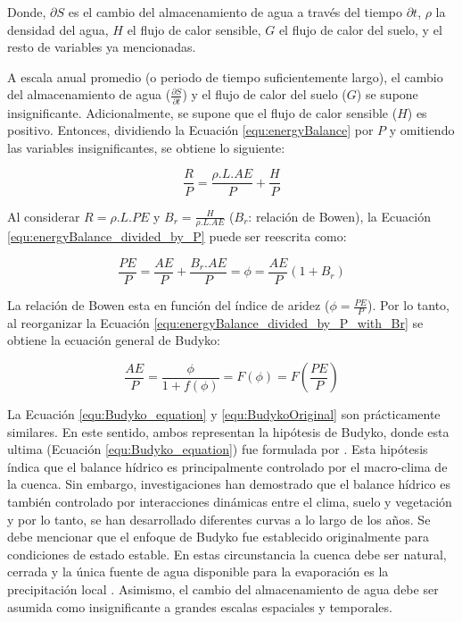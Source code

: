 \documentclass[12pt]{article}
\begin{document}
Donde, $\partial S$ es el cambio del almacenamiento de agua a través del tiempo $\partial t$, $\rho$ la densidad del agua, $H$ el flujo de calor sensible, $G$ el flujo de calor del suelo, y el resto de variables ya mencionadas. 

A escala anual promedio (o periodo de tiempo suficientemente largo), el cambio del almacenamiento de agua ($\frac{\partial S}{\partial t}$) y el flujo de calor del suelo ($G$) se supone insignificante. Adicionalmente, se supone que el flujo de calor sensible ($H$) es positivo. Entonces, dividiendo la Ecuación \ref{equ:energyBalance} por $P$ y omitiendo las variables insignificantes, se obtiene lo siguiente:

\begin{equation}
\frac{R}{P}  = \frac{\rho .L.AE}{P} + \frac{H}{P} \label{equ:energyBalance_divided_by_P}
\end{equation}

Al considerar $R  = \rho .L.PE$ y $B_{r} = \frac{H}{\rho .L.AE}$ ($B_{r}$: relación de Bowen), la Ecuación \ref{equ:energyBalance_divided_by_P} puede ser reescrita como:

\begin{equation}
\frac{PE}{P} = \frac{AE}{P} + \frac{B_{r}.AE}{P} = \phi = \frac{AE}{P}(1 + B_{r})
\label{equ:energyBalance_divided_by_P_with_Br}
\end{equation}

La relación de Bowen esta en función del índice de aridez ($\phi = \frac{PE}{P}$). Por lo tanto, al reorganizar la Ecuación \ref{equ:energyBalance_divided_by_P_with_Br} se obtiene la ecuación general de Budyko:

\begin{equation}
\frac{AE}{P} = \frac{\phi}{1 + f(\phi )} = F(\phi ) = F\left ( \frac{PE}{P} \right ) 
\label{equ:Budyko_equation}
\end{equation}

La Ecuación \ref{equ:Budyko_equation} y \ref{equ:BudykoOriginal} son prácticamente similares. En este sentido, ambos representan la hipótesis de Budyko, donde esta ultima (Ecuación \ref{equ:Budyko_equation}) fue formulada por \citet{arora2002use}. Esta hipótesis índica que el balance hídrico es principalmente controlado por el macro-clima de la cuenca. Sin embargo, investigaciones han demostrado que el balance hídrico es también controlado por interacciones dinámicas entre el clima, suelo y vegetación \citep{Gentine2012,Berghuijs2014,Greve2015} y por lo tanto, se han desarrollado diferentes curvas a lo largo de los años. Se debe mencionar que el enfoque de Budyko fue establecido originalmente para condiciones de estado estable. En estas circunstancia la cuenca debe ser natural, cerrada y la única fuente de agua disponible para la evaporación es la precipitación local \citep{Du2016}. Asimismo, el cambio del almacenamiento de agua debe ser asumida como insignificante a grandes escalas espaciales y temporales.
\end{document}
